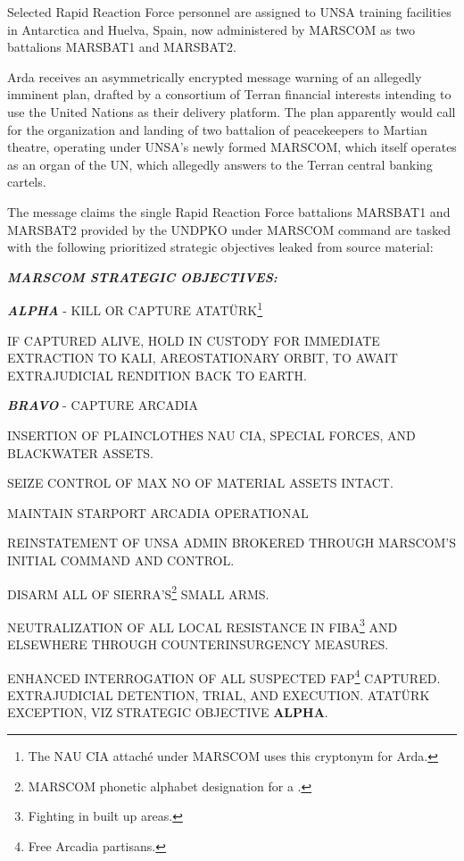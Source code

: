 Selected Rapid Reaction Force personnel are assigned to UNSA training facilities in Antarctica and Huelva, Spain, now administered by MARSCOM as two battalions MARSBAT1 and MARSBAT2.
\StopTimelineDate

Arda receives an asymmetrically encrypted message warning of an allegedly imminent plan, drafted by a consortium of Terran financial interests intending to use the United Nations as their delivery platform. The plan apparently would call for the organization and landing of two battalion of peacekeepers to Martian theatre, operating under UNSA's newly formed MARSCOM, which itself operates as an organ of the UN, which allegedly answers to the Terran central banking cartels.

The message claims the single Rapid Reaction Force battalions MARSBAT1 and MARSBAT2 provided by the UNDPKO under MARSCOM command are tasked with the following prioritized strategic objectives leaked from source material:

\startTimelineCorrespondenceDocument
{\bf\em MARSCOM STRATEGIC OBJECTIVES:}
\startitemize[4]
\item {\bf\em ALPHA} - KILL OR CAPTURE ATATÜRK\footnote{The NAU CIA attaché under MARSCOM uses this cryptonym for Arda.}

    \startitemize[n]
    \item IF CAPTURED ALIVE, HOLD IN CUSTODY FOR IMMEDIATE EXTRACTION TO KALI, AREOSTATIONARY ORBIT, TO AWAIT EXTRAJUDICIAL RENDITION BACK TO EARTH.
    \stopitemize

\item {\bf\em BRAVO} - CAPTURE ARCADIA
    \startitemize[n]
    \item INSERTION OF PLAINCLOTHES NAU CIA, SPECIAL FORCES, AND BLACKWATER ASSETS.
    \item SEIZE CONTROL OF MAX NO OF MATERIAL ASSETS INTACT.
    \item MAINTAIN STARPORT ARCADIA OPERATIONAL
    \item REINSTATEMENT OF UNSA ADMIN BROKERED THROUGH MARSCOM'S INITIAL COMMAND AND CONTROL.
    \item DISARM ALL OF SIERRA'S\footnote{MARSCOM phonetic alphabet designation for a .} SMALL ARMS.
    \item NEUTRALIZATION OF ALL LOCAL RESISTANCE IN FIBA\footnote{Fighting in built up areas.} AND ELSEWHERE THROUGH COUNTERINSURGENCY MEASURES.
    \item ENHANCED INTERROGATION OF ALL SUSPECTED FAP\footnote{Free Arcadia partisans.} CAPTURED. EXTRAJUDICIAL DETENTION, TRIAL, AND EXECUTION. ATATÜRK EXCEPTION, VIZ STRATEGIC OBJECTIVE {\bf ALPHA}.
    \stopitemize


